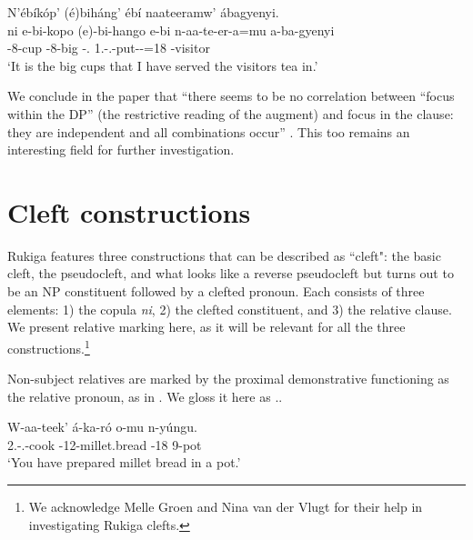 \documentclass[output=paper]{langscibook}
\begin{document}
\z

\ea
\label{bkm:Ref127995600}
N’ébíkóp’ (é)biháng’ ébí naateeramw’ ábagyenyi. \\
\gll
ni  e-bi-kopo  (e)-bi-hango  e-bi  n-aa-te-er-a=mu  a-ba-gyenyi\\
\COP{}  \AUG{}-8-cup  {\db}\AUG{}-8-big  \AUG{}-\REL{}.\PRO{} 1\SG{}.\SM{}-\N{}.\PST{}-put-\APPL{}-\FV{}=18  -visitor\\
\glt ‘It is the big cups that I have served the visitors tea in.’\\


\z


We conclude in the paper that “there seems to be no correlation between “focus within the DP” (the restrictive reading of the augment) and focus in the clause: they are independent and all combinations occur” \citep[1333]{AsiimweEtAl2023}. This too remains an interesting field for further investigation.

\section{Cleft constructions}\label{sec:cleft-constructions}

Rukiga features three constructions that can be described as ``cleft": the basic cleft, the pseudocleft, and what looks like a reverse pseudocleft but turns out to be an NP constituent followed by a clefted pronoun. Each consists of three elements: 1) the copula \textit{ni}, 2) the clefted constituent, and 3) the relative clause. We present relative marking here, as it will be relevant for all the three constructions.\footnote{We acknowledge Melle Groen and Nina van der Vlugt for their help in investigating Rukiga clefts.}

Non-subject relatives are marked by the proximal demonstrative functioning as the relative pronoun, as in . We gloss it here as \REL{}.\PRO{}.

\ea
\label{bkm:Ref98922886}
\citep[1287--1288]{AsiimweEtAl2023}
\ea
\label{bkm:Ref98922886:a}
\gll
W-aa-teek’  á-ka-ró  o-mu  n-yúngu.\\
2\PL{}.\SM{}-\N{}.\PST{}-cook  \AUG{}-12-millet.bread  \AUG{}-18  9-pot\\
\glt
‘You have prepared millet bread in a pot.’\\
\end{document}
